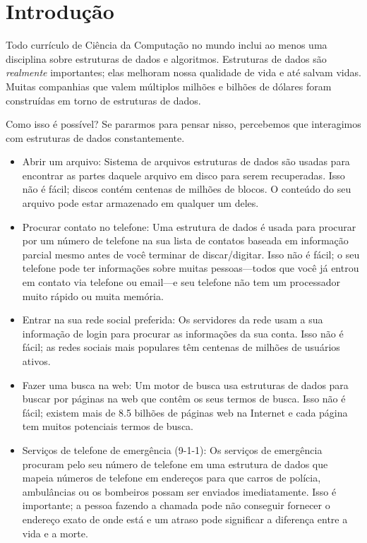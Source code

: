 \chapter{Introdução}
Todo currículo de Ciência da Computação no mundo inclui ao menos uma disciplina sobre estruturas de dados e algoritmos.
Estruturas de dados são \emph{realmente} importantes;
elas melhoram nossa qualidade de vida e até salvam vidas.
Muitas companhias que valem múltiplos milhões e bilhões de dólares foram construídas em torno de estruturas de dados.

Como isso é possível? Se pararmos para pensar nisso, percebemos que interagimos com estruturas de dados constantemente.

\begin{itemize}
  \item  Abrir um arquivo: Sistema de arquivos 
    estruturas de dados são usadas para encontrar
    as partes daquele arquivo em disco para serem recuperadas.
    Isso não é fácil; discos contém centenas de milhões de blocos.
    O conteúdo do seu arquivo pode estar armazenado em qualquer um deles.
  \item Procurar contato no telefone: Uma estrutura de dados é usada para procurar por um número de telefone na sua lista de contatos 
    baseada em informação parcial mesmo antes de você terminar de discar/digitar.
    Isso não é fácil;
o seu telefone pode ter informações sobre muitas pessoas---todos que você já entrou em contato via telefone ou email---e seu telefone não tem um processador muito rápido ou muita memória.
  \item Entrar na sua rede social preferida:
    Os servidores da rede
    usam a sua informação de login para procurar as informações da sua conta.
    Isso não é fácil; as redes sociais mais populares têm centenas de milhões de usuários ativos.
  \item Fazer uma busca na web: 
    Um motor de busca usa estruturas de dados para buscar
    por páginas na web que contêm os seus termos de busca.
    Isso não é fácil; existem mais de 8.5 bilhões de páginas web na Internet
    e cada página tem muitos potenciais termos de busca.
  \item Serviços de telefone de emergência (9-1-1):
    Os serviços de emergência procuram pelo seu número de telefone em uma estrutura de dados que mapeia números de telefone em endereços para que carros de polícia, ambulâncias ou os bombeiros possam ser enviados imediatamente.
    Isso é importante; a pessoa fazendo a chamada pode não conseguir fornecer o endereço exato de onde está e um atraso pode significar a diferença entre a vida e a morte.
\end{itemize}

